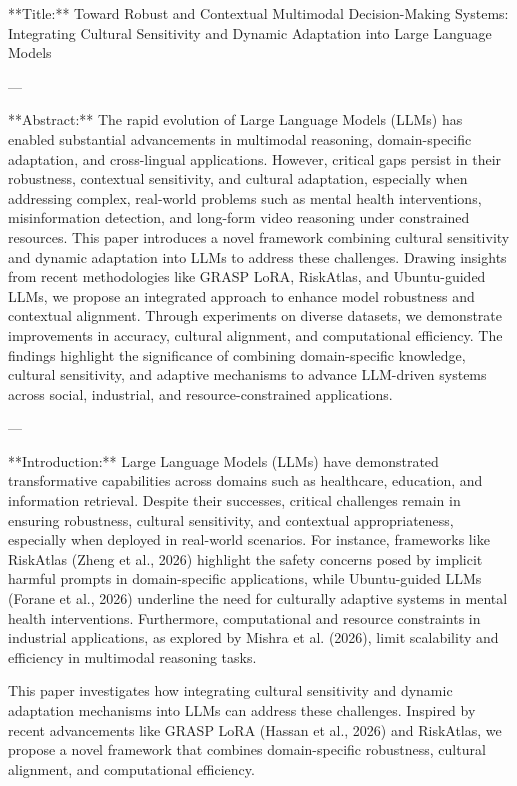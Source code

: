 **Title:** Toward Robust and Contextual Multimodal Decision-Making Systems: Integrating Cultural Sensitivity and Dynamic Adaptation into Large Language Models  

---

**Abstract:**  
The rapid evolution of Large Language Models (LLMs) has enabled substantial advancements in multimodal reasoning, domain-specific adaptation, and cross-lingual applications. However, critical gaps persist in their robustness, contextual sensitivity, and cultural adaptation, especially when addressing complex, real-world problems such as mental health interventions, misinformation detection, and long-form video reasoning under constrained resources. This paper introduces a novel framework combining cultural sensitivity and dynamic adaptation into LLMs to address these challenges. Drawing insights from recent methodologies like GRASP LoRA, RiskAtlas, and Ubuntu-guided LLMs, we propose an integrated approach to enhance model robustness and contextual alignment. Through experiments on diverse datasets, we demonstrate improvements in accuracy, cultural alignment, and computational efficiency. The findings highlight the significance of combining domain-specific knowledge, cultural sensitivity, and adaptive mechanisms to advance LLM-driven systems across social, industrial, and resource-constrained applications.  

---

**Introduction:**  
Large Language Models (LLMs) have demonstrated transformative capabilities across domains such as healthcare, education, and information retrieval. Despite their successes, critical challenges remain in ensuring robustness, cultural sensitivity, and contextual appropriateness, especially when deployed in real-world scenarios. For instance, frameworks like RiskAtlas (Zheng et al., 2026) highlight the safety concerns posed by implicit harmful prompts in domain-specific applications, while Ubuntu-guided LLMs (Forane et al., 2026) underline the need for culturally adaptive systems in mental health interventions. Furthermore, computational and resource constraints in industrial applications, as explored by Mishra et al. (2026), limit scalability and efficiency in multimodal reasoning tasks.  

This paper investigates how integrating cultural sensitivity and dynamic adaptation mechanisms into LLMs can address these challenges. Inspired by recent advancements like GRASP LoRA (Hassan et al., 2026) and RiskAtlas, we propose a novel framework that combines domain-specific robustness, cultural alignment, and computational efficiency.  

